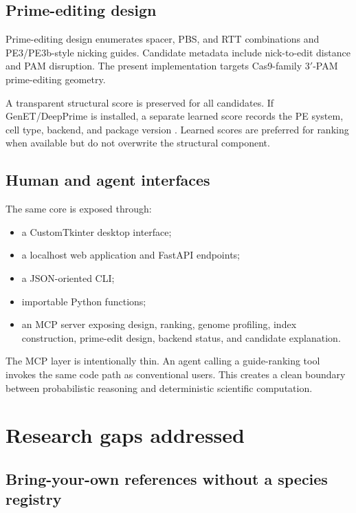 \documentclass[11pt]{article}
\begin{document}
\subsection{Prime-editing design}

Prime-editing design enumerates spacer, PBS, and RTT combinations and PE3/PE3b-style nicking guides. Candidate metadata include nick-to-edit distance and PAM disruption. The present implementation targets Cas9-family 3$'$-PAM prime-editing geometry.

A transparent structural score is preserved for all candidates. If GenET/DeepPrime is installed, a separate learned score records the PE system, cell type, backend, and package version \citep{yu2023deepprime}. Learned scores are preferred for ranking when available but do not overwrite the structural component.

\subsection{Human and agent interfaces}

The same core is exposed through:

\begin{itemize}[leftmargin=*]
\item a CustomTkinter desktop interface;
\item a localhost web application and FastAPI endpoints;
\item a JSON-oriented CLI;
\item importable Python functions;
\item an MCP server exposing design, ranking, genome profiling, index construction, prime-edit design, backend status, and candidate explanation.
\end{itemize}

The MCP layer is intentionally thin. An agent calling a guide-ranking tool invokes the same code path as conventional users. This creates a clean boundary between probabilistic reasoning and deterministic scientific computation.

\section{Research gaps addressed}

\subsection{Bring-your-own references without a species registry}
\end{document}
